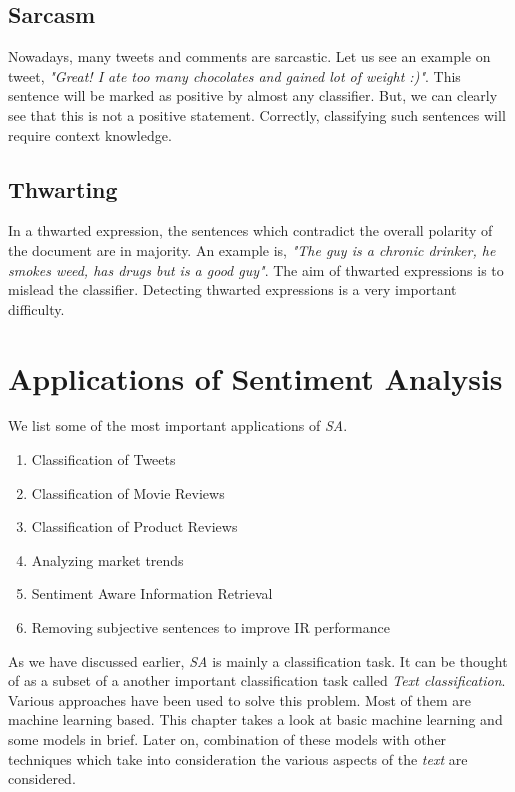 \subsection{Sarcasm}
Nowadays, many tweets and comments are sarcastic. Let us see an example on tweet, \textit{"Great! I ate too many chocolates and
gained lot of weight :)"}. This sentence will be marked as positive by almost any classifier. But, we can clearly see that this is
not a positive statement. Correctly, classifying such sentences will require context knowledge.

\subsection{Thwarting}
In a thwarted expression, the sentences which contradict the overall polarity of the document are in majority. An example is,
\textit{"The guy is a chronic drinker, he smokes weed, has drugs but is a good guy"}. The aim of thwarted expressions is to 
mislead the classifier. Detecting thwarted expressions is a very important difficulty.

\section{Applications of Sentiment Analysis}

We list some of the most important applications of \textit{SA}.

\begin{enumerate}
 \item	Classification of Tweets
 \item	Classification of Movie Reviews
 \item	Classification of Product Reviews
 \item	Analyzing market trends
 \item  Sentiment Aware Information Retrieval
 \item 	Removing subjective sentences to improve IR performance
\end{enumerate}


\par
As we have discussed earlier, \textit{SA} is mainly a classification task. It can be thought of as a subset of a another important classification
task called \textit{Text classification}. Various approaches have been used to solve this problem. Most of them are machine learning 
based. This chapter takes a look at basic machine learning and some models in brief. Later on, combination of these models with other
techniques which take into consideration the various aspects of the \textit{text} are considered.

